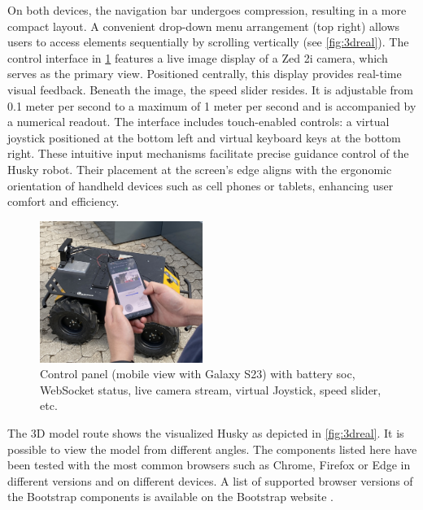 \documentclass[conference]{IEEEtran}
\begin{document}
On both devices, the navigation bar undergoes compression, resulting in a more compact layout.
A convenient drop-down menu arrangement (top right) allows users to access elements sequentially by scrolling vertically (see \cref{fig:3dreal}).
The control interface in \cref{fig:galaxycontrol} features a live image display of a Zed 2i camera, which serves as the primary view. Positioned centrally, this display provides real-time visual feedback. Beneath the image, the speed slider resides. It is adjustable from 0.1 meter per second to a maximum of 1 meter per second and is accompanied by a numerical readout.
The interface includes touch-enabled controls: a virtual joystick positioned at the bottom left and virtual keyboard keys at the bottom right. These intuitive input mechanisms facilitate precise guidance control of the Husky robot. 
Their placement at the screen's edge aligns with the ergonomic orientation of handheld devices such as cell phones or tablets, enhancing user comfort and efficiency. 
\begin{figure}[b]
    \centerline{\includegraphics[width=5.3cm]{Pictures/galaxycontrol.jpg}}
    \caption{Control panel (mobile view with Galaxy S23) with battery soc, WebSocket status, live camera stream, virtual Joystick, speed slider, etc.}
    \label{fig:galaxycontrol}
\end{figure}
The 3D model route shows the visualized Husky as depicted in \cref{fig:3dreal}. It is possible to view the model from different angles.
The components listed here have been tested with the most common browsers such as Chrome, Firefox or Edge in different versions and on different devices. A list of supported browser versions of the Bootstrap components is available on the Bootstrap website \cite{bsBrowsers}. 
\end{document}
